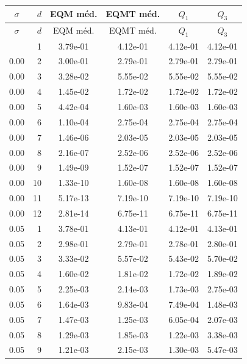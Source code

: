 \begin{longtable}{S[table-format=1.2] r S[table-format=1.2e-2] S[table-format=1.2e-2] S[table-format=1.2e-2] S[table-format=1.2e-2]}
\toprule
{\(\sigma\)} & {\(d\)} & {EQM m\'ed.} & {EQMT m\'ed.} & {\(Q_1\)} & {\(Q_3\)} \\
\midrule
\endfirsthead
\toprule
{\(\sigma\)} & {\(d\)} & {EQM m\'ed.} & {EQMT m\'ed.} & {\(Q_1\)} & {\(Q_3\)} \\
\midrule
\endhead
\bottomrule
{} & 1 & 3.79e-01 & 4.12e-01 & 4.12e-01 & 4.12e-01 \\
0.00 & 2 & 3.00e-01 & 2.79e-01 & 2.79e-01 & 2.79e-01 \\
0.00 & 3 & 3.28e-02 & 5.55e-02 & 5.55e-02 & 5.55e-02 \\
0.00 & 4 & 1.45e-02 & 1.72e-02 & 1.72e-02 & 1.72e-02 \\
0.00 & 5 & 4.42e-04 & 1.60e-03 & 1.60e-03 & 1.60e-03 \\
0.00 & 6 & 1.10e-04 & 2.75e-04 & 2.75e-04 & 2.75e-04 \\
0.00 & 7 & 1.46e-06 & 2.03e-05 & 2.03e-05 & 2.03e-05 \\
0.00 & 8 & 2.16e-07 & 2.52e-06 & 2.52e-06 & 2.52e-06 \\
0.00 & 9 & 1.49e-09 & 1.52e-07 & 1.52e-07 & 1.52e-07 \\
0.00 & 10 & 1.33e-10 & 1.60e-08 & 1.60e-08 & 1.60e-08 \\
0.00 & 11 & 5.17e-13 & 7.19e-10 & 7.19e-10 & 7.19e-10 \\
0.00 & 12 & 2.81e-14 & 6.75e-11 & 6.75e-11 & 6.75e-11 \\
0.05 & 1 & 3.78e-01 & 4.13e-01 & 4.12e-01 & 4.13e-01 \\
0.05 & 2 & 2.98e-01 & 2.79e-01 & 2.78e-01 & 2.80e-01 \\
0.05 & 3 & 3.33e-02 & 5.57e-02 & 5.43e-02 & 5.70e-02 \\
0.05 & 4 & 1.60e-02 & 1.81e-02 & 1.72e-02 & 1.89e-02 \\
0.05 & 5 & 2.25e-03 & 2.14e-03 & 1.73e-03 & 2.75e-03 \\
0.05 & 6 & 1.64e-03 & 9.83e-04 & 7.49e-04 & 1.48e-03 \\
0.05 & 7 & 1.47e-03 & 1.25e-03 & 6.05e-04 & 2.07e-03 \\
0.05 & 8 & 1.29e-03 & 1.85e-03 & 1.22e-03 & 3.38e-03 \\
0.05 & 9 & 1.21e-03 & 2.15e-03 & 1.30e-03 & 5.47e-03 \\

\end{longtable}

